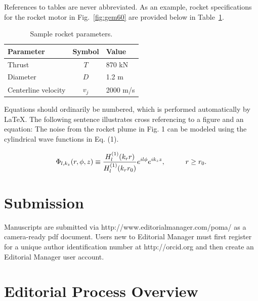 \documentclass[12pt,letter]{article}
\begin{document}
References to tables are never abbreviated.  As an example, rocket specifications for the rocket motor in Fig.~\ref{fig:gem60} are provided below in Table~\ref{tab:rocket}.

\begin{table}
	\centering
	\caption{\label{tab:rocket}Sample rocket parameters.}
\begin{tabular}{lcl}
	\textbf{Parameter} & \textbf{Symbol} & \textbf{Value} \\ \hline
	Thrust & $T$ & 870 kN \\
	Diameter & $D$ & 1.2 m \\
	Centerline velocity & $v_j$ & 2000 m/s
\end{tabular}
\end{table}

Equations should ordinarily be numbered, which is performed automatically by \LaTeX.  The following sentence illustrates cross referencing to a figure and an equation: The noise from the rocket plume in Fig. 1 can be modeled using the cylindrical wave functions in Eq. (1).

\begin{equation}
	\Phi_{l,k_z}(r,\phi,z) \equiv \frac{H_l^{(1)}(k_rr)}{H_l^{(1)}(k_rr_0)} e^{il\phi}e^{ik_zz}, \hspace{10mm} r\ge r_0.
\end{equation}




\section{Submission}

Manuscripts are submitted via http://www.editorialmanager.com/poma/ as a camera-ready pdf document. Users new to Editorial Manager must first register for a unique author identification number at http://orcid.org and then create an Editorial Manager user account.


\section{Editorial Process Overview}
\end{document}
